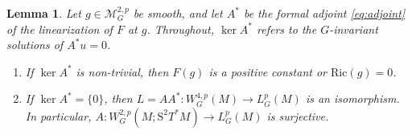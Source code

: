 \documentclass[12pt,a4paper]{amsart}
\theoremstyle{plain}
\newtheorem{lemma}[theorem]{Lemma}
\theoremstyle{definition}
\theoremstyle{remark}
\newcommand{\ga}{\mathit{g}} %
\begin{document}
\begin{lemma}\label{lem:marsden}
Let $\ga \in \mathcal{M}_G^{2,p}$ be smooth, and let $A^*$ be the formal adjoint \eqref{eq:adjoint} of the linearization of $F$ at $\ga$. Throughout, $\ker A^*$ refers to the $G$-invariant solutions of $A^* u = 0$.
    \begin{enumerate}[label=\textup{(\alph*)}, font=\upshape]
        \item If $\ker A^*$ is non-trivial, then $F(\ga)$ is a positive constant or $\mathrm{Ric}(\ga) = 0$. 
        \item If $\ker A^* = \{0\}$, then $L = AA^* : W_G^{4,p}(M) \to L_G^p(M)$ is an isomorphism. In particular, $A: W_G^{2,p}(M; \mathrm{S}^2T^{\ast}M) \to L_G^p(M)$ is surjective.
    \end{enumerate}
\end{lemma}
\end{document}
